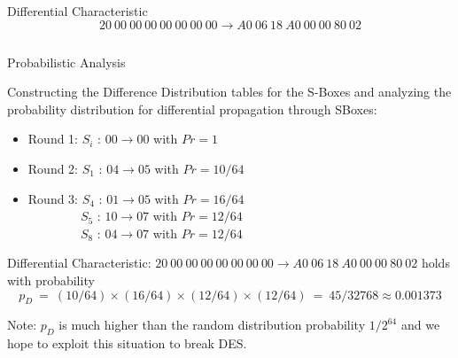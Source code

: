 \documentclass[9pt]{beamer}
\begin{document}
\begin{frame}
\begin{columns}
\begin{column}{0.6\textwidth}
\vspace{5mm}
\pause Differential Characteristic
\[ 20\:00\:00\:00\:00\:00\:00\:00 \rightarrow A0\:06\:18\:A0\:00\:00\:80\:02 \]
\end{column}
\end{columns}
\end{frame}

\begin{frame}
Probabilistic Analysis

\vspace{5mm}
Constructing the Difference Distribution tables for the S-Boxes and analyzing the probability distribution for differential propagation through SBoxes:

\vspace{2mm}
\pause
\begin{itemize}[<+->]
\item{Round 1: $S_i$ : $00 \rightarrow 00$ with $Pr = 1$}
\item{Round 2: $S_1$ : $04 \rightarrow 05$ with $Pr = 10/64$}
\item{Round 3: $S_4$ : $01 \rightarrow 05$  with $Pr = 16/64$ \\ $\qquad \qquad \: S_5$ : $10 \rightarrow 07$ with $Pr = 12/64$ \\ $\qquad \qquad \: S_8$ : $04 \rightarrow 07$ with $Pr = 12/64$}
\end{itemize}

\vspace{3mm}
\pause Differential Characteristic: $20\:00\:00\:00\:00\:00\:00\:00 \rightarrow A0\:06\:18\:A0\:00\:00\:80\:02$ holds with probability
\[ p_D \: = \: (10/64) \times (16/64) \times (12/64) \times (12/64) \: = \: 45/32768 \approx 0.001373 \]

\vspace{2mm}
\pause Note: $p_D$ is much higher than the random distribution probability $1/2^{64}$ and we hope to exploit this situation to break DES.

\end{frame}
\end{document}
